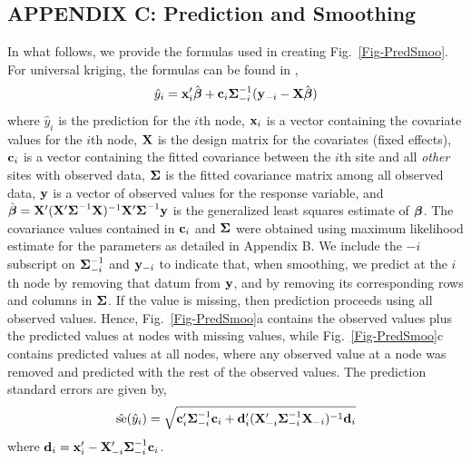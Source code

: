 \documentclass[11pt, titlepage]{article}\usepackage[]{graphicx}\usepackage[]{color}
\begin{document}
\begin{spacing}{1.9}
\begin{flushleft}

\clearpage
\setcounter{equation}{0}
\renewcommand{\theequation}{C.\arabic{equation}}
\setcounter{figure}{0}
\renewcommand{\thefigure}{C.\arabic{figure}}
\section{APPENDIX C: Prediction and Smoothing}

In what follows, we provide the formulas used in creating Fig.~\ref{Fig-PredSmoo}.  For universal kriging, the formulas can be found in \citet[][p. 148]{Cres:Wikl:stat:2011},
\[
				\hat{y}_i = \mathbf{x}_i^{\prime}\hat{\mbox{\boldmath $\beta$}} + \mathbf{c}_i\mbox{\boldmath $\Sigma$}^{-1}_{-i}(\mathbf{y}_{-i} - \mathbf{X}\hat{\mbox{\boldmath $\beta$}})
\]
where $\hat{y}_i$ is the prediction for the $i$th node, $\mathbf{x}_i$ is a vector containing the covariate values for the $i$th node, $\mathbf{X}$ is the design matrix for the covariates (fixed effects), $\mathbf{c}_i$ is a vector containing the fitted covariance between the $i$th site and all \emph{other} sites with observed data, $\mbox{\boldmath $\Sigma$}$ is the fitted covariance matrix among all observed data, $\mathbf{y}$ is a vector of observed values for the response variable, and $\hat{\mbox{\boldmath $\beta$}} = \mathbf{X}^{\prime}(\mathbf{X}^{\prime}\mbox{\boldmath $\Sigma$}^{-1}\mathbf{X})^{-1}\mathbf{X}^{\prime}\mbox{\boldmath $\Sigma$}^{-1}\mathbf{y}$ is the generalized least squares estimate of $\mbox{\boldmath $\beta$}$.  The covariance values contained in $\mathbf{c}_i$ and $\mbox{\boldmath $\Sigma$}$ were obtained using maximum likelihood estimate for the parameters as detailed in Appendix B.  We include the $-i$ subscript on $\mbox{\boldmath $\Sigma$}^{-1}_{-i}$ and $\mathbf{y}_{-i}$ to indicate that, when smoothing, we predict at the $i$th node by removing that datum from $\mathbf{y}$, and by removing its corresponding rows and columns in $\mbox{\boldmath $\Sigma$}$.  If the value is missing, then prediction proceeds using all observed values.  Hence, Fig.~\ref{Fig-PredSmoo}a contains the observed values plus the predicted values at nodes with missing values, while Fig.~\ref{Fig-PredSmoo}c contains predicted values at all nodes, where any observed value at a node was removed and predicted with the rest of the observed values.  The prediction standard errors are given by,
\[
	\hat{\textrm{se}}(\hat{y}_i) = \sqrt{\mathbf{c}_i^{\prime}\mbox{\boldmath $\Sigma$}^{-1}_{-i}\mathbf{c}_i + 
	  \mathbf{d}_i^{\prime}(\mathbf{X}_{-i}^{\prime}\mbox{\boldmath $\Sigma$}^{-1}_{-i}\mathbf{X}_{-i})^{-1} \mathbf{d}_i}
\]
where $\mathbf{d}_i = \mathbf{x}_i^{\prime} - \mathbf{X}_{-i}^{\prime}\mbox{\boldmath $\Sigma$}^{-1}_{-i}\mathbf{c}_i$.


\end{flushleft}
\end{spacing}
\end{document}
